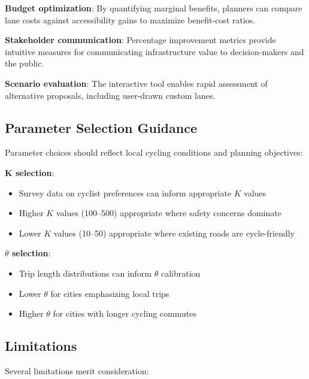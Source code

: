 \documentclass[12pt,a4paper]{article}
\begin{document}
\textbf{Budget optimization}: By quantifying marginal benefits, planners can compare lane costs against accessibility gains to maximize benefit-cost ratios.

\textbf{Stakeholder communication}: Percentage improvement metrics provide intuitive measures for communicating infrastructure value to decision-makers and the public.

\textbf{Scenario evaluation}: The interactive tool enables rapid assessment of alternative proposals, including user-drawn custom lanes.

\subsection{Parameter Selection Guidance}

Parameter choices should reflect local cycling conditions and planning objectives:

\textbf{K selection}:
\begin{itemize}
    \item Survey data on cyclist preferences can inform appropriate $K$ values
    \item Higher $K$ values (100--500) appropriate where safety concerns dominate
    \item Lower $K$ values (10--50) appropriate where existing roads are cycle-friendly
\end{itemize}

\textbf{$\theta$ selection}:
\begin{itemize}
    \item Trip length distributions can inform $\theta$ calibration
    \item Lower $\theta$ for cities emphasizing local trips
    \item Higher $\theta$ for cities with longer cycling commutes
\end{itemize}

\subsection{Limitations}

Several limitations merit consideration:
\end{document}
